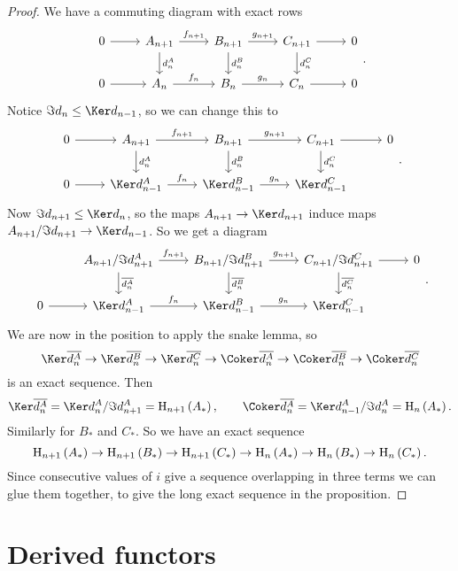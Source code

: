 \begin{proof}
We have a commuting diagram with exact rows
$$
\begin{tikzcd}
0 \arrow{r} & A_{n + 1} \arrow{r}{f_{n + 1}} \arrow{d}{d_n^A} & B_{n + 1} \arrow{r}{g_{n + 1}} \arrow{d}{d_n^B} & C_{n + 1} \arrow{r} \arrow{d}{d_n^C} & 0 \\
0 \arrow{r} & A_n \arrow{r}{f_n} & B_n \arrow{r}{g_n} & C_n \arrow{r} & 0
\end{tikzcd}.
$$
Notice $ \Im d_n \le \Ker d_{n - 1} $, so we can change this to
$$
\begin{tikzcd}
0 \arrow{r} & A_{n + 1} \arrow{r}{f_{n + 1}} \arrow{d}{d_n^A} & B_{n + 1} \arrow{r}{g_{n + 1}} \arrow{d}{d_n^B} & C_{n + 1} \arrow{r} \arrow{d}{d_n^C} & 0 \\
0 \arrow{r} & \Ker d_{n - 1}^A \arrow{r}{f_n} & \Ker d_{n - 1}^B \arrow{r}{g_n} & \Ker d_{n - 1}^C &
\end{tikzcd}.
$$
Now $ \Im d_{n + 1} \le \Ker d_n $, so the maps $ A_{n + 1} \to \Ker d_{n + 1} $ induce maps $ A_{n + 1} / \Im d_{n + 1} \to \Ker d_{n - 1} $. So we get a diagram
$$
\begin{tikzcd}
& A_{n + 1} / \Im d_{n + 1}^A \arrow{r}{f_{n + 1}} \arrow{d}{\overline{d_n^A}} & B_{n + 1} / \Im d_{n + 1}^B \arrow{r}{g_{n + 1}} \arrow{d}{\overline{d_n^B}} & C_{n + 1} / \Im d_{n + 1}^C \arrow{r} \arrow{d}{\overline{d_n^C}} & 0 \\
0 \arrow{r} & \Ker d_{n - 1}^A \arrow{r}{f_n} & \Ker d_{n - 1}^B \arrow{r}{g_n} & \Ker d_{n - 1}^C &
\end{tikzcd}.
$$
We are now in the position to apply the snake lemma, so
$$ \Ker \overline{d_n^A} \to \Ker \overline{d_n^B} \to \Ker \overline{d_n^C} \to \Coker \overline{d_n^A} \to \Coker \overline{d_n^B} \to \Coker \overline{d_n^C} $$
is an exact sequence. Then
$$ \Ker \overline{d_n^A} = \Ker d_n^A / \Im d_{n + 1}^A = \H_{n + 1}\br{A_*}, \qquad \Coker \overline{d_n^A} = \Ker d_{n - 1}^A / \Im d_n^A = \H_n\br{A_*}. $$
Similarly for $ B_* $ and $ C_* $. So we have an exact sequence
$$ \H_{n + 1}\br{A_*} \to \H_{n + 1}\br{B_*} \to \H_{n + 1}\br{C_*} \to \H_n\br{A_*} \to \H_n\br{B_*} \to \H_n\br{C_*}. $$
Since consecutive values of $ i $ give a sequence overlapping in three terms we can glue them together, to give the long exact sequence in the proposition.
\end{proof}

\pagebreak

\section{Derived functors}

